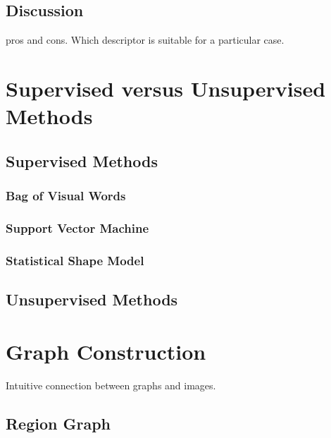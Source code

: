 \documentclass{SMBV12}
\begin{document}
\subsection{Discussion}

pros and cons. Which descriptor is suitable for a particular case.

\section{Supervised versus Unsupervised Methods}



\subsection{Supervised Methods}



\subsubsection{Bag of Visual Words}



\subsubsection{Support Vector Machine}



\subsubsection{Statistical Shape Model}



\subsection{Unsupervised Methods}



\section{Graph Construction}

Intuitive connection between graphs and images.

\subsection{Region Graph}
\end{document}
